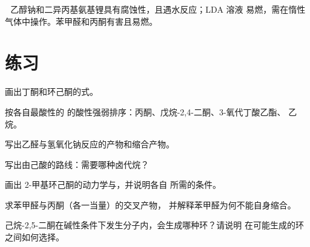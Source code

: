 \begin{safety}{\,\,}
乙醇钠和二异丙基氨基锂具有腐蚀性，且遇水反应；LDA 溶液
易燃，需在惰性气体中操作。苯甲醛和丙酮有害且易燃。
\end{safety}

\section{练习}

\begin{exercise}[$\star$]\label{exo:b2:enolates-aldol:1}
画出丁酮和环己酮的式。
\end{exercise}

\begin{exercise}[$\star$]\label{exo:b2:enolates-aldol:2}
按各自最酸性的  的酸性强弱排序：丙酮、戊烷-2,4-二酮、3-氧代丁酸乙酯、
乙烷。
\end{exercise}

\begin{exercise}[$\star$]\label{exo:b2:enolates-aldol:3}
写出乙醛与氢氧化钠反应的产物和缩合产物。
\end{exercise}

\begin{exercise}[$\star$]\label{exo:b2:enolates-aldol:4}
写出由己酸的路线：需要哪种卤代烷？
\end{exercise}

\begin{exercise}[$\star\star$]\label{exo:b2:enolates-aldol:5}
画出 2-甲基环己酮的动力学与，并说明各自
所需的条件。
\end{exercise}

\begin{exercise}[$\star\star$]\label{exo:b2:enolates-aldol:6}
求苯甲醛与丙酮（各一当量）的交叉产物，
并解释苯甲醛为何不能自身缩合。
\end{exercise}

\begin{exercise}[$\star\star$]\label{exo:b2:enolates-aldol:7}
己烷-2,5-二酮在碱性条件下发生分子内，会生成哪种环？请说明
在可能生成的环之间如何选择。
\end{exercise}

